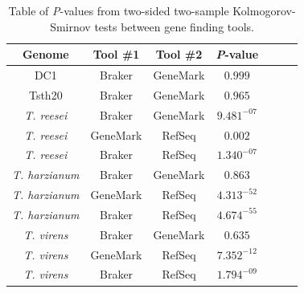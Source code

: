 \begin{table}
  \begin{center}
    \begin{tabular}{|c|c|c|c|c|c|c|}
      \hline
      Genome & Tool \#1 & Tool \#2 & \textit{P}-value  \\ \hline
      DC1 & Braker & GeneMark & $0.999$ \\ \hline
      Tsth20 & Braker & GeneMark & $0.965$ \\ \hline
      \textit{T. reesei} & Braker & GeneMark & $9.481^{-07}$ \\ \hline
      \textit{T. reesei} & GeneMark & RefSeq & $0.002$ \\ \hline
      \textit{T. reesei} & Braker & RefSeq & $1.340^{-07}$ \\ \hline
      \textit{T. harzianum} & Braker & GeneMark & $0.863$ \\ \hline
      \textit{T. harzianum} & GeneMark & RefSeq & $4.313^{-52}$ \\ \hline
      \textit{T. harzianum} & Braker & RefSeq & $4.674^{-55}$ \\ \hline
      \textit{T. virens} & Braker & GeneMark & $0.635$ \\ \hline
      \textit{T. virens} & GeneMark & RefSeq & $7.352^{-12}$ \\ \hline
      \textit{T. virens} & Braker & RefSeq & $1.794^{-09}$ \\ \hline
    \end{tabular}
  \end{center}
  \caption{Table of \textit{P}-values from two-sided two-sample
    Kolmogorov-Smirnov tests between gene finding tools.}
  \label{table:ks-2s}
\end{table}
